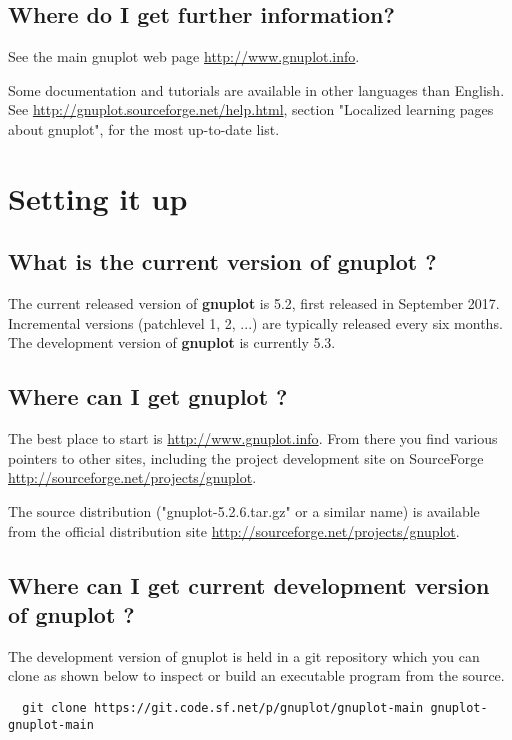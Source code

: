 \documentclass[a4paper,11pt]{article}
\def\http#1{{\small\href{http://#1}{\url{http://#1}}}}
\newcommand{\http}[1]%
            {\htmladdnormallink{\latex{\url{http://#1}}%
                    \html{\textit{http://#1}}}%
                {http://#1}%
            }
\newcommand{\gnuplot}{\textbf{gnuplot }}
\begin{document}
\subsection{Where do I get further information?}

See the main gnuplot web page \http{www.gnuplot.info}.

Some documentation and tutorials are available in other languages than English.
See \http{gnuplot.sourceforge.net/help.html}, section "Localized learning pages
about gnuplot", for the most up-to-date list.


\section{Setting it up}

\subsection{What is the current version of \gnuplot?}

The current released version of \gnuplot is 5.2, first released in September 2017.
Incremental versions (patchlevel 1, 2, ...) are typically released every six months.
The development version of \gnuplot is currently 5.3.

\subsection{Where can I get \gnuplot?}
\label{where-get-gnuplot}

The best place to start is \http{www.gnuplot.info}. From there
you find various pointers to other sites, including the project
development site on SourceForge \http{sourceforge.net/projects/gnuplot}.

The source distribution ("gnuplot-5.2.6.tar.gz" or a similar name) is
available from the official distribution site \http{sourceforge.net/projects/gnuplot}.

\subsection{Where can I get current development version of \gnuplot?}

The development version of gnuplot is held in a git repository which you
can clone as shown below to inspect or build an executable program
from the source.

\scriptsize
\begin{verbatim}
  git clone https://git.code.sf.net/p/gnuplot/gnuplot-main gnuplot-gnuplot-main
\end{verbatim}
\normalsize
\end{document}
